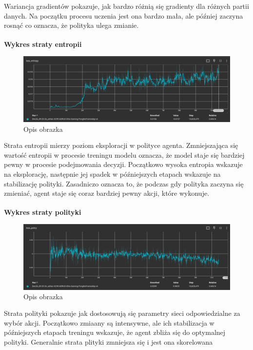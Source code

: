 \documentclass[a4paper, 12pt]{article}
\begin{document}
    Wariancja gradientów pokazuje, jak bardzo różnią się gradienty dla różnych partii danych. 
    Na początku procesu uczenia jest ona bardzo mała, ale później zaczyna rosnąć co oznacza, że polityka ulega zmianie.
    \\ \\ 
    \textbf{Wykres straty entropii}
    \begin{figure}[H]
        \centering
        \includegraphics[width=\textwidth]{pictures/A2C_loss_entropy.png}
        \caption{Opis obrazka}
    \end{figure}
    Strata entropii mierzy poziom eksploracji w polityce agenta. Zmniejszająca się wartość entropii w procesie treningu modelu
    oznacza, że model staje się bardziej pewny w procesie podejmowania decyzji. Początkowo wysoka entropia wskazuje na eksplorację,
    następnie jej spadek w późniejszych etapach wskazuje na stabilizację polityki.
    Zasadniczo oznacza to, że podczas gdy polityka zaczyna się zmieniać, agent staje się coraz bardziej pewny akcji, które wykonuje.
    \\ \\ 
    \textbf{Wykres straty polityki}
    \begin{figure}[H]
        \centering
        \includegraphics[width=\textwidth]{pictures/A2C_loss_policy.png}
        \caption{Opis obrazka}
    \end{figure}
    Strata polityki pokazuje jak dostosowują się parametry sieci odpowiedzialne za wybór akcji.
    Początkowo zmiaany są intensywne, ale ich stabilizacja w późniejszych etapach treningu wskazuje,
    że agent zbliża się do optymalnej polityki. Generalnie strata plityki zmniejsza się i jest ona skorelowana
\end{document}
